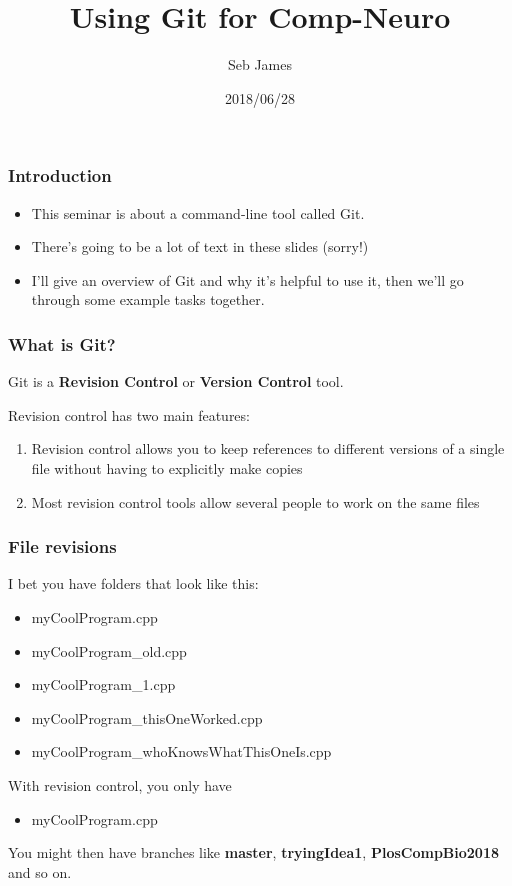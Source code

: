 \documentclass{beamer}
\title{Using Git for Comp-Neuro}
\author{Seb James}
\institute{ABRG Sheffield Internal Seminar}
\date{2018/06/28}
\begin{document}
\begin{frame}
  \titlepage %
\end{frame}

\begin{frame}
  \frametitle{Introduction}
  \begin{itemize}
    \item This seminar is about a command-line tool called Git.

    \item There's going to be a lot of \alert{text} in these slides (sorry!)

    \item I'll give an overview of Git and why it's helpful to use it, then we'll go
      through some example tasks together.
  \end{itemize}
\end{frame}

\begin{frame}
  \frametitle{What is Git?}
  Git is a \textbf{Revision Control} or \textbf{Version Control} tool.

  Revision control has two main features:

  \begin{enumerate}
    \pause \item Revision control allows you to keep references to different versions of a
      single file \pause without having to explicitly make copies
      \pause \item Most revision control tools allow several people to work
      on the same files %
  \end{enumerate}
\end{frame}

\begin{frame}
  \frametitle{File revisions}
  I bet you have folders that look like this:
  \pause \begin{itemize}
      \item myCoolProgram.cpp
      \pause \item myCoolProgram\_old.cpp
      \pause \item myCoolProgram\_1.cpp
      \pause \item myCoolProgram\_thisOneWorked.cpp
      \item myCoolProgram\_whoKnowsWhatThisOneIs.cpp
  \end{itemize}
  \pause With revision control, you only have
  \begin{itemize}
  \item myCoolProgram.cpp
  \end{itemize}
  \pause You might then have \alert{branches} like \textbf{master},
  \textbf{tryingIdea1}, \textbf{PlosCompBio2018} and so on.
\end{frame}
\end{document}
